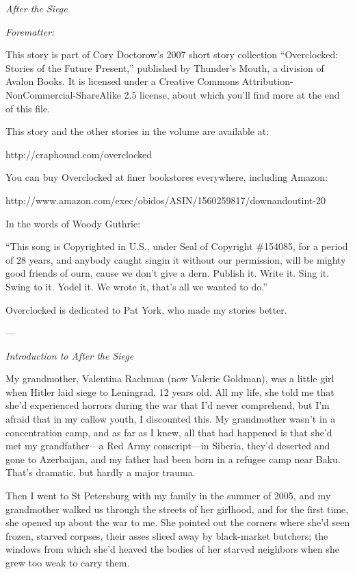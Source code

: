 \emph{After the Siege}

\emph{Forematter:}

This story is part of Cory Doctorow’s 2007 short story collection
“Overclocked: Stories of the Future Present,” published by
Thunder’s Mouth, a division of Avalon Books. It is licensed under a
Creative Commons Attribution-NonCommercial-ShareAlike 2.5 license,
about which you’ll find more at the end of this file.

This story and the other stories in the volume are available at:

http://craphound.com/overclocked

You can buy Overclocked at finer bookstores everywhere, including
Amazon:

http://www.amazon.com/exec/obidos/ASIN/1560259817/downandoutint-20

In the words of Woody Guthrie:

“This song is Copyrighted in U.S., under Seal of Copyright
\#154085, for a period of 28 years, and anybody caught singin it
without our permission, will be mighty good friends of ourn, cause
we don’t give a dern. Publish it. Write it. Sing it. Swing to it.
Yodel it. We wrote it, that’s all we wanted to do.”

Overclocked is dedicated to Pat York, who made my stories better.

—

\emph{Introduction to After the Siege}

My grandmother, Valentina Rachman (now Valerie Goldman), was a
little girl when Hitler laid siege to Leningrad, 12 years old. All
my life, she told me that she’d experienced horrors during the war
that I’d never comprehend, but I’m afraid that in my callow youth,
I discounted this. My grandmother wasn’t in a concentration camp,
and as far as I knew, all that had happened is that she’d met my
grandfather—a Red Army conscript—in Siberia, they’d deserted and
gone to Azerbaijan, and my father had been born in a refugee camp
near Baku. That’s dramatic, but hardly a major trauma.

Then I went to St Petersburg with my family in the summer of 2005,
and my grandmother walked us through the streets of her girlhood,
and for the first time, she opened up about the war to me. She
pointed out the corners where she’d seen frozen, starved corpses,
their asses sliced away by black-market butchers; the windows from
which she’d heaved the bodies of her starved neighbors when she
grew too weak to carry them.

